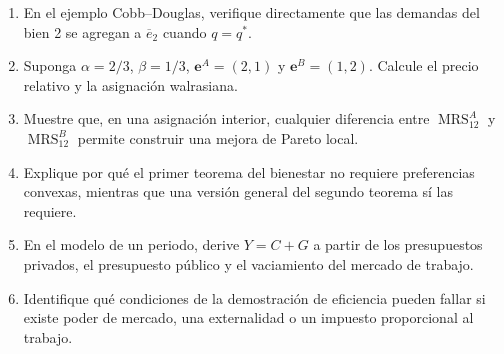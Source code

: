 \documentclass[12pt]{article}
\theoremstyle{cideplain}
\theoremstyle{cidedef}
\DeclareMathOperator{\MRS}{MRS}
\newcommand{\e}{\bm e}
\begin{document}
\begin{enumerate}
  \item En el ejemplo Cobb--Douglas, verifique directamente que las demandas del bien 2
  se agregan a \(\overline e_2\) cuando \(q=q^*\).

  \item Suponga \(\alpha=2/3\), \(\beta=1/3\),
  \(\e^A=(2,1)\) y \(\e^B=(1,2)\). Calcule el precio relativo y la asignación walrasiana.

  \item Muestre que, en una asignación interior, cualquier diferencia entre
  \(\MRS_{12}^A\) y \(\MRS_{12}^B\) permite construir una mejora de Pareto local.

  \item Explique por qué el primer teorema del bienestar no requiere preferencias convexas,
  mientras que una versión general del segundo teorema sí las requiere.

  \item En el modelo de un periodo, derive \(Y=C+G\) a partir de los presupuestos privados,
  el presupuesto público y el vaciamiento del mercado de trabajo.

  \item Identifique qué condiciones de la demostración de eficiencia pueden fallar si existe
  poder de mercado, una externalidad o un impuesto proporcional al trabajo.
\end{enumerate}

\nocite{JehleReny2011,Williamson2018}


\end{document}
